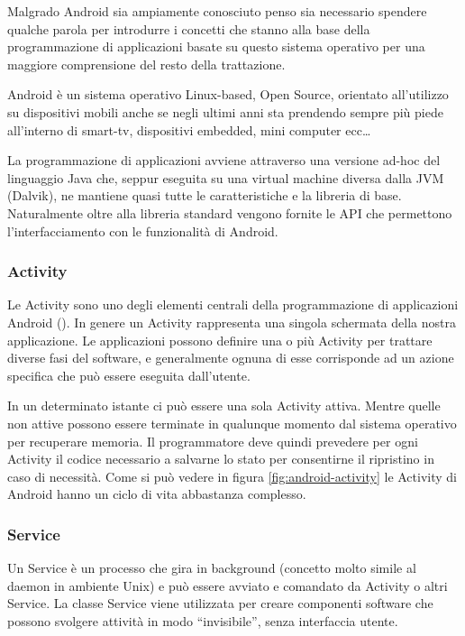 Malgrado Android sia ampiamente conosciuto penso sia necessario spendere qualche parola per introdurre i concetti che stanno alla base della programmazione di applicazioni basate su questo sistema operativo per una maggiore comprensione del resto della trattazione.

Android è un sistema operativo Linux-based, Open Source, orientato all'utilizzo su dispositivi mobili anche se negli ultimi anni sta prendendo sempre più piede all'interno di smart-tv, dispositivi embedded, mini computer ecc\dots

La programmazione di applicazioni avviene attraverso una versione ad-hoc del linguaggio Java che, seppur eseguita su una virtual machine diversa dalla JVM (Dalvik), ne mantiene quasi tutte le caratteristiche e la libreria di base. Naturalmente oltre alla libreria standard vengono fornite le API che permettono l'interfacciamento con le funzionalità di Android.

\subsubsection{Activity}

Le Activity sono uno degli elementi centrali della programmazione di applicazioni Android (\cite{html:android}). In genere un Activity rappresenta una singola schermata della nostra applicazione. Le applicazioni possono definire una o più Activity per trattare diverse fasi del software, e generalmente ognuna di esse corrisponde ad un azione specifica che può essere eseguita dall'utente. 

In un determinato istante ci può essere una sola Activity attiva. Mentre quelle non attive possono essere terminate in qualunque momento dal sistema operativo per recuperare memoria. Il programmatore deve quindi prevedere per ogni Activity il codice necessario a salvarne lo stato per consentirne il ripristino in caso di necessità. Come si può vedere in figura \ref{fig:android-activity} le Activity di Android hanno un ciclo di vita abbastanza complesso. 

\subsubsection{Service}

Un Service è un processo che gira in background (concetto molto simile al daemon in ambiente Unix) e può essere avviato e comandato da Activity o altri Service. La classe Service viene utilizzata per creare componenti software che possono svolgere attività in modo ``invisibile'', senza interfaccia utente.


